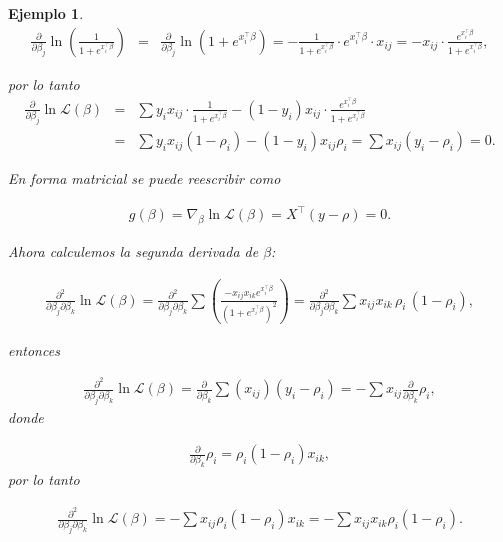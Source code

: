 \documentclass[12pt]{article}
\newtheorem{Ejem}{Ejemplo}%
\begin{document}
\begin{Ejem}
\begin{eqnarray*}
\frac{\partial}{\partial \beta_j} \ln \left( \frac{1}{1 + e^{x_i^\top \beta}} \right) 
&=& \frac{\partial}{\partial \beta_j} \ln \left(1 + e^{x_i^\top \beta} \right)
= - \frac{1}{1 + e^{x_i^\top \beta}} \cdot e^{x_i^\top \beta} \cdot x_{ij}= -x_{ij} \cdot \frac{e^{x_i^\top \beta}}{1 + e^{x_i^\top \beta}},
\end{eqnarray*}

por lo tanto
\begin{eqnarray*}
\frac{\partial}{\partial \beta_j} \ln \mathcal{L}(\beta) &=&
\sum y_i x_{ij} \cdot \frac{1}{1 + e^{x_i^\top \beta}} 
- (1 - y_i) x_{ij} \cdot \frac{e^{x_i^\top \beta}}{1 + e^{x_i^\top \beta}}\\
&=& \sum y_i x_{ij} (1 - \rho_i) - (1 - y_i) x_{ij} \rho_i
= \sum x_{ij} (y_i - \rho_i) = 0.
\end{eqnarray*}

En forma matricial se puede reescribir como

\begin{eqnarray*}
g(\beta) = \nabla_\beta \ln \mathcal{L}(\beta) = X^\top (y - \rho) = 0.
\end{eqnarray*}

Ahora calculemos la segunda derivada de $\beta$:

\begin{eqnarray*}
\frac{\partial^2}{\partial \beta_j \partial \beta_k} \ln \mathcal{L}(\beta)= \frac{\partial^2}{\partial \beta_j \partial \beta_k}\sum \left( \frac{-x_{ij} x_{ik} e^{x_i^\top \beta}}{(1 + e^{x_i^\top \beta})^2} \right)= \frac{\partial^2}{\partial \beta_j \partial \beta_k}\sum x_{ij} x_{ik} \, \rho_i \, (1 - \rho_i),
\end{eqnarray*}

entonces

\begin{eqnarray*}
\frac{\partial^2}{\partial \beta_j \partial \beta_k} \ln \mathcal{L}(\beta)= \frac{\partial}{\partial \beta_k} \sum (x_{ij}) (y_i - \rho_i)= -\sum x_{ij} \frac{\partial}{\partial \beta_k} \rho_i,
\end{eqnarray*}
donde

\begin{eqnarray*}
\frac{\partial}{\partial \beta_k} \rho_i = \rho_i (1 - \rho_i) x_{ik},
\end{eqnarray*}
por lo tanto

\begin{eqnarray*}
\frac{\partial^2}{\partial \beta_j \partial \beta_k} \ln \mathcal{L}(\beta)= -\sum x_{ij} \rho_i (1 - \rho_i) x_{ik}= -\sum x_{ij} x_{ik} \rho_i (1 - \rho_i).
\end{eqnarray*}



\end{Ejem}
\end{document}
